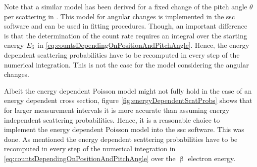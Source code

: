 Note that a similar model has been derived for a fixed change of the pitch angle $\theta$ per scattering in \cite{Groh2015}. This model for angular changes is implemented in the \gls{ssc} software and can be used in fitting procedures. Though, an important difference is that the determination of the count rate requires an integral over the starting energy $E_\mathrm{S}$ in \eqref{eq:countsDependingOnPositionAndPitchAngle}. Hence, the energy dependent scattering probabilities have to be recomputed in every step of the numerical integration. This is not the case for the model considering the angular changes.

Albeit the energy dependent Poisson model might not fully hold in the case of an energy dependent cross section, figure \ref{fig:energyDependentScatProbs} shows that for larger measurement intervals it is more accurate than assuming energy independent scattering probabilities. Hence, it is a reasonable choice to implement the energy dependent Poisson model into the \gls{ssc} software. This was done. As mentioned the energy dependent scattering probabilities have to be recomputed in every step of the numerical integration in \eqref{eq:countsDependingOnPositionAndPitchAngle} over the $\upbeta$ electron energy. 

